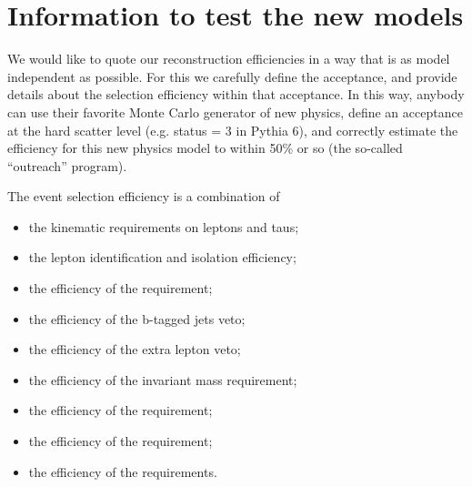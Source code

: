 \section{Information to test the new models}
\label{sect:model}
We would like to quote our reconstruction efficiencies in a way that is as model independent as possible. For this
we carefully define the acceptance, and provide details about the selection efficiency within that acceptance. In
this way, anybody can use their favorite Monte Carlo generator of new physics, define an acceptance at the hard
scatter level (e.g. status = 3 in Pythia 6), and correctly estimate the efficiency for this new physics model to within
50\% or so (the so-called “outreach” program).

The event selection efficiency is a combination of
\begin{itemize}
\item the kinematic requirements on leptons and taus;
\item the lepton identification and isolation efficiency;
\item the efficiency of the \MPT requirement;
\item the efficiency of the b-tagged jets veto;
\item the efficiency of the extra lepton veto;
\item the efficiency of the invariant mass requirement;
\item the efficiency of the \mindphifour requirement;
\item the efficiency of the \mttwo requirement;
\item the efficiency of the \mt requirements.
\end{itemize}


